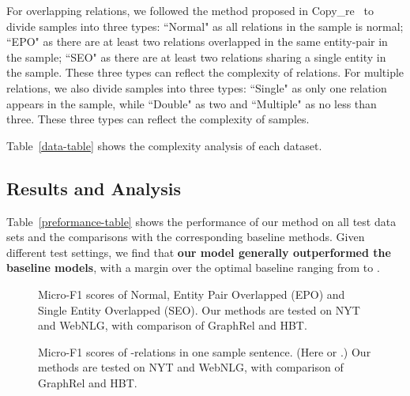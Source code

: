 \documentclass[11pt,a4paper]{article}
\begin{document}
For overlapping relations, we followed the method proposed in Copy\_re~\cite{zeng2018extracting} to divide samples into three types: ``Normal" as all relations in the sample is normal; ``EPO" as there are at least two relations overlapped in the same entity-pair in the sample; ``SEO" as there are at least two relations sharing a single entity in the sample. These three types can reflect the complexity of relations. 
For multiple relations, we also divide samples into three types: ``Single" as only one relation appears in the sample, while ``Double" as two and ``Multiple" as no less than three. These three types can reflect the complexity of samples.

Table~\ref{data-table} shows the complexity analysis of each dataset. 


\subsection{Results and Analysis}

Table~\ref{preformance-table} shows the performance of our method on all test data sets and the comparisons with the corresponding baseline methods. Given different test settings, we find that \textbf{our model generally outperformed the baseline models}, with a margin over the optimal baseline ranging from  to .


\begin{figure*}[ht]
\centering
{}\centering
\caption{Micro-F1 scores of Normal, Entity Pair Overlapped (EPO) and Single Entity Overlapped (SEO). Our methods are tested on NYT and WebNLG, with comparison of GraphRel and HBT.}

\label{overlapped}
\end{figure*}

\begin{figure*}[htbp]
\centering
{}

\centering
\caption{Micro-F1 scores of -relations in one sample sentence. (Here  or .) Our methods are tested on NYT and WebNLG, with comparison of GraphRel and HBT.}

\label{multi}
\end{figure*}
\end{document}
